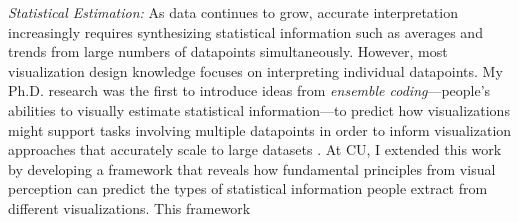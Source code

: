 \documentclass[11pt]{article}
\begin{document}
\emph{Statistical Estimation: }As data continues to grow, accurate interpretation increasingly requires synthesizing 
statistical information such as averages and trends from large numbers of datapoints simultaneously.
However, most visualization design knowledge focuses on interpreting individual datapoints.
My Ph.D. research was the first to introduce ideas from \emph{ensemble coding}---people's abilities to visually estimate statistical information---to predict how visualizations might support tasks involving multiple datapoints in order to inform visualization approaches that accurately scale to large datasets \cite{albers2014task,albers2011sequence,correll2012comparing}. 
At CU, I extended this work by developing a framework that reveals how fundamental principles from visual perception can predict the types of statistical information people extract from different visualizations. This framework 
\end{document}

